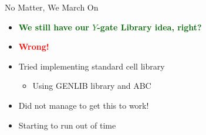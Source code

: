 \begin{frame}[t]{}
	\Huge No Matter, We March On
	\normalsize
	\begin{itemize}
		\item \textbf{\textcolor{darkgreen}{We still have our $Y$-gate Library idea, right?}}
		\pause
		\item \textbf{\textcolor{red}{Wrong!}}
		\item Tried implementing standard cell library
		\begin{itemize}
			\item Using GENLIB library and ABC
		\end{itemize}
		\item Did not manage to get this to work!
		\item Starting to run out of time
	\end{itemize}
\end{frame}

